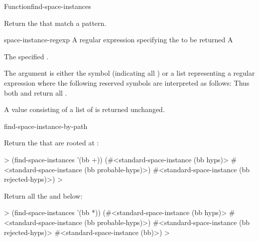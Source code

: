 \documentclass[10pt,twoside,english,pdftex]{article}
\begin{document}
\begin{functiondoc}{Function}{find-space-instances}%
  {
    \returns{} }

\fnsyntax

\fnpurpose Return the  that match a
 pattern.

\fnpackage {}

\fnmodule {}

\fnargs
\begin{args}{space-instance-regexp}
 A  regular expression
specifying the  to be returned 
 A 
\end{args}

\fnreturns The specified .

\fndescription 
{}%
The  argument is either the symbol
 (indicating all ) or a list
representing a regular expression where the following reserved symbols
are interpreted as follows: 
\spaceinstanceregexp
Thus both  and
 return all .

A  value consisting of a list of
 is returned unchanged.

\begin{alsos}{find-space-instance-by-path}
\end{alsos}

\fnexamples
Return the  that are rooted at :
%
\W\supp
\begin{example}
  > (find-space-instances '(bb +))
  (#<standard-space-instance (bb hyps)>
   #<standard-space-instance (bb probable-hyps)>)
   #<standard-space-instance (bb rejected-hyps)>)
  >
\end{example}
%
Return all the   and below:
%
\W\supp\notpretop
\begin{example}
  > (find-space-instances '(bb *))
  (#<standard-space-instance (bb hyps)>
   #<standard-space-instance (bb probable-hyps)>)
   #<standard-space-instance (bb rejected-hyps)>
   #<standard-space-instance (bb)>)
  >
\end{example}

\end{functiondoc}
\end{document}
